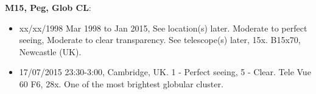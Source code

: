 {\bf M15, Peg, Glob CL}:
\begin{itemize}
\item xx/xx/1998 Mar 1998 to Jan 2015, See location(s) later. Moderate to perfect seeing, Moderate to clear transparency. See telescope(s) later, 15x. B15x70, Newcastle (UK).
\item 17/07/2015 23:30-3:00, Cambridge, UK. 1 - Perfect seeing, 5 - Clear. Tele Vue 60 F6, 28x. One of the most brightest globular cluster. 
\end{itemize}
